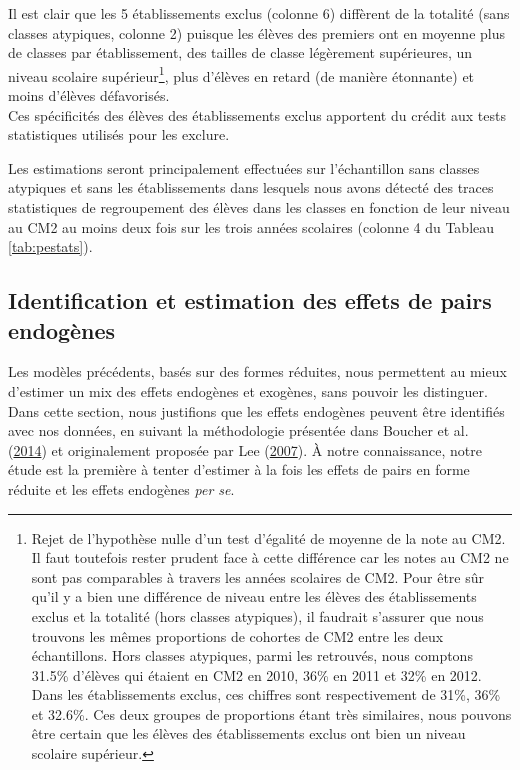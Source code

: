 \documentclass[
]{book}
\begin{document}
\quad Il est clair que les 5 établissements exclus (colonne 6) diffèrent de la totalité (sans classes atypiques, colonne 2) puisque les élèves des premiers ont en moyenne plus de classes par établissement, des tailles de classe légèrement supérieures, un niveau scolaire supérieur\footnote{Rejet de l'hypothèse nulle d'un test d'égalité de moyenne de la note au CM2. Il faut toutefois rester prudent face à cette différence car les notes au CM2 ne sont pas comparables à travers les années scolaires de CM2. Pour être sûr qu'il y a bien une différence de niveau entre les élèves des établissements exclus et la totalité (hors classes atypiques), il faudrait s'assurer que nous trouvons les mêmes proportions de cohortes de CM2 entre les deux échantillons. Hors classes atypiques, parmi les retrouvés, nous comptons 31.5\% d'élèves qui étaient en CM2 en 2010, 36\% en 2011 et 32\% en 2012. Dans les établissements exclus, ces chiffres sont respectivement de 31\%, 36\% et 32.6\%. Ces deux groupes de proportions étant très similaires, nous pouvons être certain que les élèves des établissements exclus ont bien un niveau scolaire supérieur.}, plus d'élèves en retard (de manière étonnante) et moins d'élèves défavorisés.\\
Ces spécificités des élèves des établissements exclus apportent du crédit aux tests statistiques utilisés pour les exclure.

\quad Les estimations seront principalement effectuées sur l'échantillon sans classes atypiques et sans les établissements dans lesquels nous avons détecté des traces statistiques de regroupement des élèves dans les classes en fonction de leur niveau au CM2 au moins deux fois sur les trois années scolaires (colonne 4 du Tableau \ref{tab:pestats}).

\hypertarget{pemethodsbeal}{%
\subsection{Identification et estimation des effets de pairs endogènes}\label{pemethodsbeal}}

Les modèles précédents, basés sur des formes réduites, nous permettent au mieux d'estimer un mix des effets endogènes et exogènes, sans pouvoir les distinguer. Dans cette section, nous justifions que les effets endogènes peuvent être identifiés avec nos données, en suivant la méthodologie présentée dans Boucher et al. (\protect\hyperlink{ref-BOU:eal:14}{2014}) et originalement proposée par Lee (\protect\hyperlink{ref-LEE:07}{2007}). À notre connaissance, notre étude est la première à tenter d'estimer à la fois les effets de pairs en forme réduite et les effets endogènes \emph{per se}.
\end{document}
